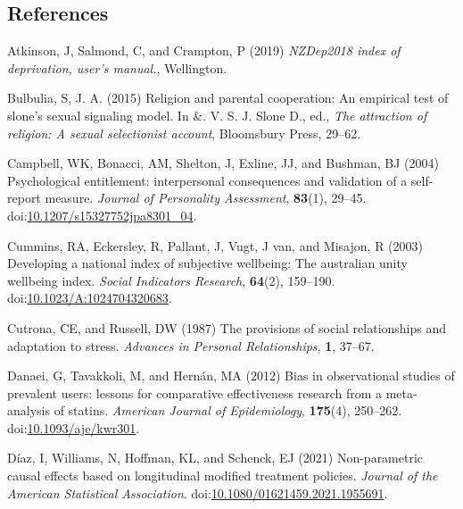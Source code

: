 \documentclass[
  singlecolumn,
  9pt]{article}
\newlength{\cslhangindent}
\newenvironment{CSLReferences}[2] %
 {\begin{list}{}{%
  \setlength{\itemindent}{0pt}
  \setlength{\leftmargin}{0pt}
  \setlength{\parsep}{0pt}
  \ifodd #1
   \setlength{\leftmargin}{\cslhangindent}
   \setlength{\itemindent}{-1\cslhangindent}
  \fi
  \setlength{\itemsep}{#2\baselineskip}}}
 {\end{list}}
\begin{document}
\newpage{}

\subsection*{References}\label{references}

\label{refs}
\begin{CSLReferences}{1}{0}
Atkinson, J, Salmond, C, and Crampton, P (2019) \emph{NZDep2018 index of
deprivation, user{'}s manual.}, Wellington.

Bulbulia, S, J. A. (2015) Religion and parental cooperation: An
empirical test of slone's sexual signaling model. In \&. V. S. J. Slone
D., ed., \emph{The attraction of religion: A sexual selectionist
account}, Bloomsbury Press, 29--62.

Campbell, WK, Bonacci, AM, Shelton, J, Exline, JJ, and Bushman, BJ
(2004) Psychological entitlement: interpersonal consequences and
validation of a self-report measure. \emph{Journal of Personality
Assessment}, \textbf{83}(1), 29--45.
doi:\href{https://doi.org/10.1207/s15327752jpa8301_04}{10.1207/s15327752jpa8301\_04}.

Cummins, RA, Eckersley, R, Pallant, J, Vugt, J van, and Misajon, R
(2003) Developing a national index of subjective wellbeing: The
australian unity wellbeing index. \emph{Social Indicators Research},
\textbf{64}(2), 159--190.
doi:\href{https://doi.org/10.1023/A:1024704320683}{10.1023/A:1024704320683}.

Cutrona, CE, and Russell, DW (1987) The provisions of social
relationships and adaptation to stress. \emph{Advances in Personal
Relationships}, \textbf{1}, 37--67.

Danaei, G, Tavakkoli, M, and Hernán, MA (2012) Bias in observational
studies of prevalent users: lessons for comparative effectiveness
research from a meta-analysis of statins. \emph{American Journal of
Epidemiology}, \textbf{175}(4), 250--262.
doi:\href{https://doi.org/10.1093/aje/kwr301}{10.1093/aje/kwr301}.

Díaz, I, Williams, N, Hoffman, KL, and Schenck, EJ (2021) Non-parametric
causal effects based on longitudinal modified treatment policies.
\emph{Journal of the American Statistical Association}.
doi:\href{https://doi.org/10.1080/01621459.2021.1955691}{10.1080/01621459.2021.1955691}.


\end{CSLReferences}
\end{document}
